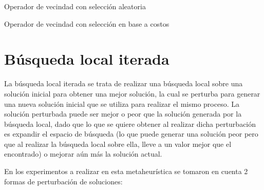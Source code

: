 \documentclass{ci5652}
\begin{document}
\begin{algorithm}
	\DontPrintSemicolon
	\vspace*{0.1cm}
	\vspace*{0.1cm}
	\caption{Operador de vecindad con selección aleatoria}
\end{algorithm}

\begin{algorithm}
	\DontPrintSemicolon
	\vspace*{0.1cm}
	\vspace*{0.1cm}
	\caption{Operador de vecindad con selección en base a costos}
\end{algorithm}

\section{Búsqueda local iterada}
La búsqueda local iterada se trata de realizar una búsqueda local sobre una solución inicial para obtener una mejor solución, la cual se perturba para generar una nueva solución inicial que se utiliza para realizar el mismo proceso. La solución perturbada puede ser mejor o peor que la solución generada por la búsqueda local, dado que lo que se quiere obtener al realizar dicha perturbación es expandir el espacio de búsqueda (lo que puede generar una solución peor pero que al realizar la búsqueda local sobre ella, lleve a un valor mejor que el encontrado) o mejorar aún más la solución actual.

En los experimentos a realizar en esta metaheurística se tomaron en cuenta 2 formas de perturbación de soluciones:
\end{document}
